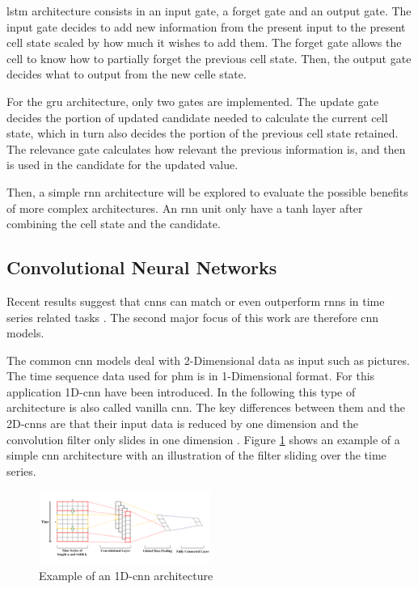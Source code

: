 \documentclass[conference]{IEEEtran}
\begin{document}
\gls{lstm} architecture consists in an input gate, a forget gate and an output gate. The input gate decides to add new information from the present input to the present cell state scaled by how much it wishes to add them. The forget gate allows the cell to know how to partially forget the previous cell state. Then, the output gate decides what to output from the new celle state.

For the \gls{gru} architecture, only two gates are implemented. The update gate decides the portion of updated candidate needed to calculate the current cell state, which in turn also decides the portion of the previous cell state retained. The relevance gate calculates how relevant the previous information is, and then is used in the candidate for the updated value.

Then, a simple \gls{rnn} architecture will be explored to evaluate the possible benefits of more complex architectures. An \gls{rnn} unit only have a tanh layer after combining the cell state and the candidate.







\noindent
\subsection{Convolutional Neural Networks}

Recent results suggest that \glspl{cnn} can match or even outperform \glspl{rnn} in time series related tasks \cite{Bai2018}. The second major focus of this work are therefore \gls{cnn} models.

The common \gls{cnn} models deal with 2-Dimensional data as input such as pictures. The time sequence data used for \gls{phm} is in 1-Dimensional format. For this application 1D-\gls{cnn} have been introduced. In the following this type of architecture is also called vanilla \gls{cnn}. The key differences between them and the 2D-\glspl{cnn} are that their input data is reduced by one dimension and the convolution filter only slides in one dimension \cite{Akrim2021}. Figure \ref{fig:1D_cnn_architecture} shows an example of a simple \gls{cnn} architecture with an illustration of the filter sliding over the time series. 

\begin{figure}[htp]
	\centering
	\includegraphics[width=0.5\textwidth]{1D_CNN_Architecture.png}
	\caption{Example of an 1D-\gls{cnn} architecture \cite{Sayyad}}
	\label{fig:1D_cnn_architecture}
\end{figure}
\end{document}
